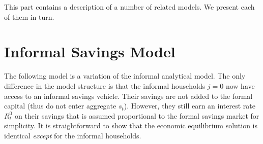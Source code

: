 \documentclass[a4paper]{article}
\begin{document}
This part contains a description of a number of related models. We present each of them in turn.



\edef\refsec{sec:models:infsav}
\edef\refeq{eq:models:infsav}


\section{Informal Savings Model}\label{\refsec}
The following model is a variation of the informal analytical model. The only difference in the model structure is that the informal households $j=0$ now have access to an informal savings vehicle. Their savings are not added to the formal capital (thus do not enter aggregate $s_t$). However, they still earn an interest rate $R_t^0$ on their savings that is assumed proportional to the formal savings market for simplicity. It is straightforward to show that the economic equilibrium solution is identical \textit{except} for the informal households.
\end{document}
